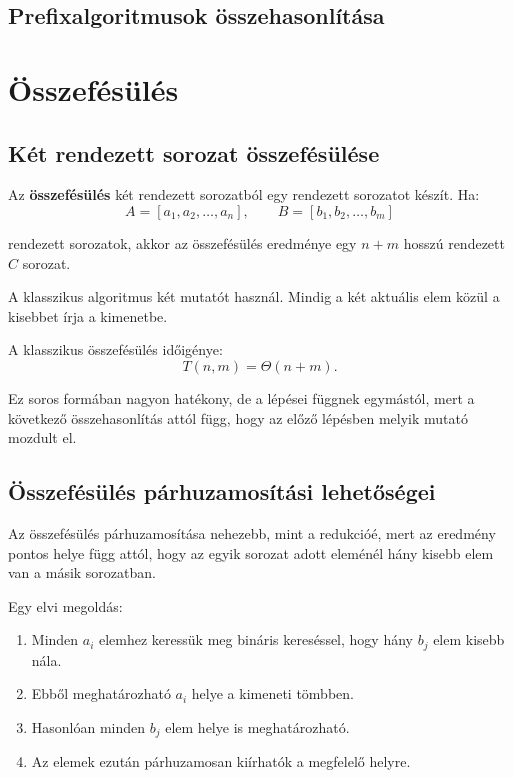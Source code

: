 \subsection{Prefixalgoritmusok összehasonlítása}

\begin{center}

\end{center}

\section{Összefésülés}

\subsection{Két rendezett sorozat összefésülése}

Az \textbf{összefésülés} két rendezett sorozatból egy rendezett sorozatot készít. Ha:
\[
  A=[a_1,a_2,\ldots,a_n],\qquad B=[b_1,b_2,\ldots,b_m]
\]

rendezett sorozatok, akkor az összefésülés eredménye egy $n+m$ hosszú rendezett $C$ sorozat.

A klasszikus algoritmus két mutatót használ. Mindig a két aktuális elem közül a kisebbet írja a kimenetbe.


A klasszikus összefésülés időigénye:
\[
  T(n,m)=\Theta(n+m).
\]

Ez soros formában nagyon hatékony, de a lépései függnek egymástól, mert a következő összehasonlítás attól függ, hogy az előző lépésben melyik mutató mozdult el.

\subsection{Összefésülés párhuzamosítási lehetőségei}

Az összefésülés párhuzamosítása nehezebb, mint a redukcióé, mert az eredmény pontos helye függ attól, hogy az egyik sorozat adott eleménél hány kisebb elem van a másik sorozatban.

Egy elvi megoldás:

\begin{enumerate}
  \item Minden $a_i$ elemhez keressük meg bináris kereséssel, hogy hány $b_j$ elem kisebb nála.
  \item Ebből meghatározható $a_i$ helye a kimeneti tömbben.
  \item Hasonlóan minden $b_j$ elem helye is meghatározható.
  \item Az elemek ezután párhuzamosan kiírhatók a megfelelő helyre.
\end{enumerate}


